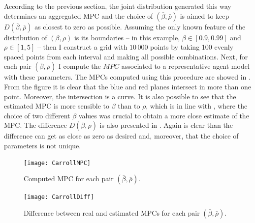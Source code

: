\documentclass[english, a4paper,12pt]{article}
\begin{document}
According to the previous section, the joint distribution generated this way determines an aggregated MPC and the choice of $(\overline{\beta}, \overline{\rho})$ is aimed to keep $D(\overline{\beta}, \overline{\rho})$ as closest to zero as possible. Assuming the only known feature of the distribution of $(\beta, \rho)$ is its boundaries -- in this example, $\beta \in [0.9, 0.99]$ and $\rho \in [1,5]$ -- then I construct a grid with $10\,000$ points by taking 100 evenly spaced points from each interval and making all possible combinations. Next, for each pair $(\overline{\beta}, \overline{\rho})$ I compute the $MPC$ associated to a representative agent model with these parameters. The MPCs computed using this procedure are showed in . From the figure it is clear that the blue and red planes intersect in more than one point. Moreover, the intersection is a curve. It is also possible to see that the estimated MPC is more sensible to $\beta$ than to $\rho$, which is in line with \cite{CarrollRequiem}, where the choice of two different $\beta$ values was crucial to obtain a more close estimate of the MPC. The difference $D(\overline{\beta}, \overline{\rho})$ is also presented in . Again is clear than the difference can get as close as zero as desired and, moreover, that the choice of parameters is not unique.
	\begin{figure}[H]
		\caption{Computed MPC for each pair $(\overline{\beta}, \overline{\rho})$.}
		\label{fig:MPCPlane}
		\texttt{[image: CarrollMPC]}
	\end{figure}
	\begin{figure}[H]
		\caption{Difference between real and estimated MPCs for each pair $\left(\overline{\beta}, \overline{\rho}\right)$.}
		\label{fig:DiffPlane}
		\texttt{[image: CarrollDiff]}
	\end{figure}
	
\end{document}
